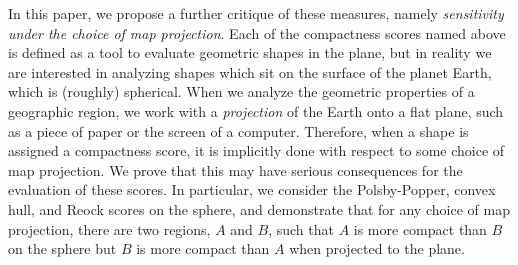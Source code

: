 In this paper, we propose a further critique of these measures, namely
\textit{sensitivity under the choice of map projection}.  Each of the
compactness scores named above is defined as a tool to evaluate
geometric shapes in the plane, but in reality we are interested in
analyzing shapes which sit on the surface of the planet Earth, which
is (roughly) spherical.  
When we analyze the geometric properties of a geographic region, we work 
with a \textit{projection} of the Earth onto a flat plane, such as a piece of 
paper or the screen of a computer.
Therefore, when a shape is assigned a compactness score,
it is implicitly done with respect to some choice of map projection.
We prove that this may have
serious consequences for the evaluation of these scores.  In
particular, we consider the Polsby-Popper, convex hull,
and Reock scores on the sphere, and demonstrate that for any choice of
map projection, there are two regions, $A$ and $B$, such that $A$ is
more compact than $B$ on the sphere but $B$ is more compact than $A$
when projected to the plane.

